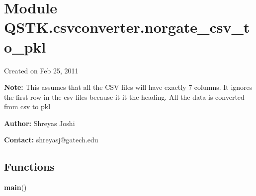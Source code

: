 %
%
%


\section{Module QSTK.csvconverter.norgate\_csv\_to\_pkl}

    \label{QSTK:csvconverter:norgate_csv_to_pkl}
Created on Feb 25, 2011

\textbf{Note:} This assumes that all the CSV files will have exactly 7 columns. It ignores
the first row in the csv files because it it the heading. All the data is 
converted from csv to pkl



\textbf{Author:} Shreyas Joshi



\textbf{Contact:} shreyasj@gatech.edu





  \subsection{Functions}

    \label{QSTK:csvconverter:norgate_csv_to_pkl:main}

    \vspace{0.5ex}

\hspace{.8\funcindent}\begin{boxedminipage}{\funcwidth}

    \raggedright \textbf{main}()

\setlength{\parskip}{2ex}
\setlength{\parskip}{1ex}
    \end{boxedminipage}


